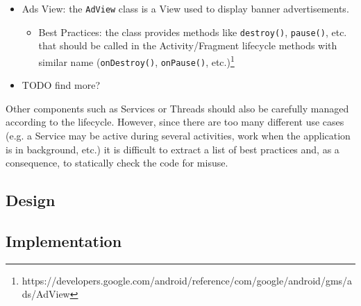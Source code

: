 \documentclass[11pt,a4paper,notitlepage]{article}
\begin{document}
\begin{itemize}
\begin{itemize}
		\end{itemize}
	\item Ads View: the \texttt{AdView} class is a View used to display banner advertisements.
	\begin{itemize}
		\item Best Practices: the class provides methods like \texttt{destroy()}, \texttt{pause()}, etc. that should be called in the Activity/Fragment lifecycle methods with similar name (\texttt{onDestroy()}, \texttt{onPause()}, etc.)\footnote{https://developers.google.com/android/reference/com/google/android/gms/ads/AdView}
	\end{itemize}
	\item TODO find more?
\end{itemize}
Other components such as Services or Threads should also be carefully managed according to the lifecycle. However, since there are too many different use cases (e.g. a Service may be active during several activities, work when the application is in background, etc.) it is difficult to extract a list of best practices and, as a consequence, to statically check the code for misuse.

\subsection{Design}

\subsection{Implementation}
\end{document}

